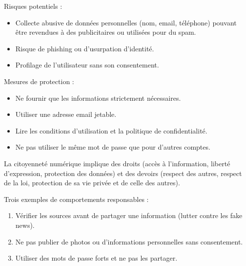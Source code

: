 Risques potentiels :
\begin{itemize}
    \item Collecte abusive de données personnelles (nom, email, téléphone) pouvant être revendues à des publicitaires ou utilisées pour du spam.
    \item Risque de phishing ou d'usurpation d'identité.
    \item Profilage de l'utilisateur sans son consentement.
\end{itemize}
Mesures de protection :
\begin{itemize}
    \item Ne fournir que les informations strictement nécessaires.
    \item Utiliser une adresse email jetable.
    \item Lire les conditions d'utilisation et la politique de confidentialité.
    \item Ne pas utiliser le même mot de passe que pour d'autres comptes.
\end{itemize}

La citoyenneté numérique implique des droits (accès à l'information, liberté d'expression, protection des données) et des devoirs (respect des autres, respect de la loi, protection de sa vie privée et de celle des autres).

Trois exemples de comportements responsables :
\begin{enumerate}
    \item Vérifier les sources avant de partager une information (lutter contre les fake news).
    \item Ne pas publier de photos ou d'informations personnelles sans consentement.
    \item Utiliser des mots de passe forts et ne pas les partager.
\end{enumerate}